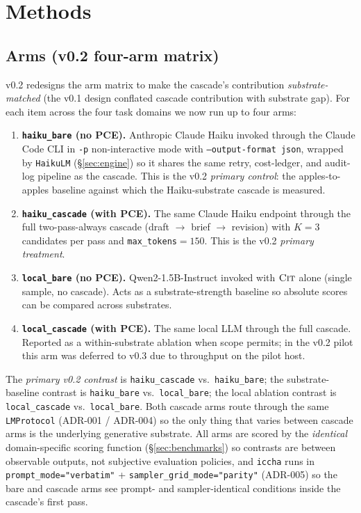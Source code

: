 \section{Methods}\label{sec:methods}

\subsection{Arms (v0.2 four-arm matrix)}

v0.2 redesigns the arm matrix to make the cascade's contribution \emph{substrate-matched} (the v0.1 design conflated cascade contribution with substrate gap). For each item across the four task domains we now run up to four arms:
\begin{enumerate}[leftmargin=1.4em]
\item \textbf{\texttt{haiku\_bare} (no PCE).} Anthropic Claude Haiku invoked through the Claude Code CLI in \texttt{-p} non-interactive mode with \texttt{--output-format json}, wrapped by \texttt{HaikuLM} (\S\ref{sec:engine}) so it shares the same retry, cost-ledger, and audit-log pipeline as the cascade. This is the v0.2 \emph{primary control}: the apples-to-apples baseline against which the Haiku-substrate cascade is measured.
\item \textbf{\texttt{haiku\_cascade} (with PCE).} The same Claude Haiku endpoint through the full two-pass-always cascade (draft $\to$  brief $\to$ revision) with $K{=}3$ candidates per pass and \texttt{max\_tokens}$=150$. This is the v0.2 \emph{primary treatment}.
\item \textbf{\texttt{local\_bare} (no PCE).} Qwen2-1.5B-Instruct invoked with $\textsc{Cit}$ alone (single sample, no cascade). Acts as a substrate-strength baseline so absolute scores can be compared across substrates.
\item \textbf{\texttt{local\_cascade} (with PCE).} The same local LLM through the full cascade. Reported as a within-substrate ablation when scope permits; in the v0.2 pilot this arm was deferred to v0.3 due to throughput on the pilot host.
\end{enumerate}
The \emph{primary v0.2 contrast} is \texttt{haiku\_cascade} vs.\ \texttt{haiku\_bare}; the substrate-baseline contrast is \texttt{haiku\_bare} vs.\ \texttt{local\_bare}; the local ablation contrast is \texttt{local\_cascade} vs.\ \texttt{local\_bare}. Both cascade arms route through the same \texttt{LMProtocol} (ADR-001 / ADR-004) so the only thing that varies between cascade arms is the underlying generative substrate. All arms are scored by the \emph{identical} domain-specific scoring function (\S\ref{sec:benchmarks}) so contrasts are between observable outputs, not subjective evaluation policies, and \texttt{iccha} runs in \texttt{prompt\_mode="verbatim"} + \texttt{sampler\_grid\_mode="parity"} (ADR-005) so the bare and cascade arms see prompt- and sampler-identical conditions inside the cascade's first pass.

